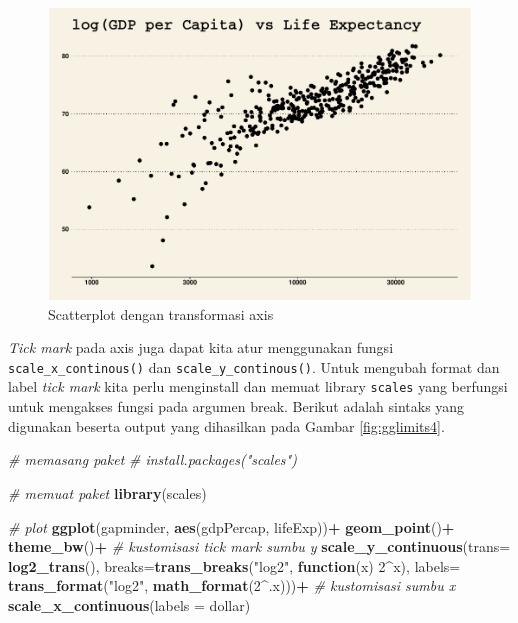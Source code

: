 \documentclass[]{book}
\newenvironment{Shaded}{\begin{snugshade}}{\end{snugshade}}
\newcommand{\KeywordTok}[1]{\textcolor[rgb]{0.13,0.29,0.53}{\textbf{#1}}}
\newcommand{\DataTypeTok}[1]{\textcolor[rgb]{0.13,0.29,0.53}{#1}}
\newcommand{\DecValTok}[1]{\textcolor[rgb]{0.00,0.00,0.81}{#1}}
\newcommand{\StringTok}[1]{\textcolor[rgb]{0.31,0.60,0.02}{#1}}
\newcommand{\CommentTok}[1]{\textcolor[rgb]{0.56,0.35,0.01}{\textit{#1}}}
\newcommand{\ControlFlowTok}[1]{\textcolor[rgb]{0.13,0.29,0.53}{\textbf{#1}}}
\newcommand{\OperatorTok}[1]{\textcolor[rgb]{0.81,0.36,0.00}{\textbf{#1}}}
\newcommand{\NormalTok}[1]{#1}
\begin{document}
\begin{figure}

{\centering \includegraphics[width=0.7\linewidth]{EnvStat_files/figure-latex/gglimits3-1} 

}

\caption{Scatterplot dengan transformasi axis }\label{fig:gglimits3}
\end{figure}

\emph{Tick mark} pada axis juga dapat kita atur menggunakan fungsi
\texttt{scale\_x\_continous()} dan \texttt{scale\_y\_continous()}. Untuk
mengubah format dan label \emph{tick mark} kita perlu menginstall dan
memuat library \texttt{scales} yang berfungsi untuk mengakses fungsi
pada argumen break. Berikut adalah sintaks yang digunakan beserta output
yang dihasilkan pada Gambar \ref{fig:gglimits4}.

\begin{Shaded}
\begin{Highlighting}[]
\CommentTok{# memasang paket}
\CommentTok{# install.packages("scales")}

\CommentTok{# memuat paket}
\KeywordTok{library}\NormalTok{(scales)}

\CommentTok{# plot}
\KeywordTok{ggplot}\NormalTok{(gapminder, }\KeywordTok{aes}\NormalTok{(gdpPercap, lifeExp))}\OperatorTok{+}
\StringTok{  }\KeywordTok{geom_point}\NormalTok{()}\OperatorTok{+}
\StringTok{  }\KeywordTok{theme_bw}\NormalTok{()}\OperatorTok{+}
\StringTok{  }\CommentTok{# kustomisasi tick mark sumbu y}
\StringTok{  }\KeywordTok{scale_y_continuous}\NormalTok{(}\DataTypeTok{trans=} \KeywordTok{log2_trans}\NormalTok{(),}
                     \DataTypeTok{breaks=}\KeywordTok{trans_breaks}\NormalTok{(}\StringTok{"log2"}\NormalTok{, }\ControlFlowTok{function}\NormalTok{(x) }\DecValTok{2}\OperatorTok{^}\NormalTok{x),}
                     \DataTypeTok{labels=} \KeywordTok{trans_format}\NormalTok{(}\StringTok{"log2"}\NormalTok{, }\KeywordTok{math_format}\NormalTok{(}\DecValTok{2}\OperatorTok{^}\NormalTok{.x)))}\OperatorTok{+}
\StringTok{  }\CommentTok{# kustomisasi sumbu x}
\StringTok{  }\KeywordTok{scale_x_continuous}\NormalTok{(}\DataTypeTok{labels =}\NormalTok{ dollar)}
\end{Highlighting}
\end{Shaded}
\end{document}
